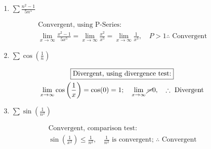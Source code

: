     \begin{itemize}
        \item [1.]
        $\sum\frac{n^{2}-1}{5n^{5}}$
        \\
        \begin{mdframed}
            \begin{equation*}
                \begin{gathered}
                    \boxed{\text{Convergent, using P-Series:}}                      \\
                      \lim_{x \to \infty}\frac{x^{2}-1}{5x^{5}}
                    = \lim_{x \to \infty}\frac{x^{2}}{x^{5}} 
                    = \lim_{x \to \infty}\frac{1}{x^{3}}, \quad 
                    P > 1 \therefore \text{ Convergent}
                \end{gathered}
            \end{equation*}
        \end{mdframed}
    
        \item [2.]
        $\sum\cos\left(\frac{1}{n}\right)$
        \\
        \begin{mdframed}
            \begin{equation*}
                \begin{gathered}
                    \boxed{\text{Divergent, using divergence test:}}                \\
                    \lim_{x \to \infty} \cos\left(\frac{1}{x}\right) = \cos(0) = 1;
                    \quad \lim_{x \to \infty} \cancel{=} 0, \quad \therefore 
                    \text{ Divergent}
                \end{gathered}
            \end{equation*}
        \end{mdframed}

        \item [3.]
        $\sum\sin\left(\frac{1}{n^{2}}\right)$
        \\
        \begin{mdframed}
            \begin{equation*}
                \begin{gathered}
                    \boxed{\text{Convergent, comparison test:}}                       \\
                    \sin\left(\frac{1}{x^{2}}\right) \leq \frac{1}{n^{2}},
                    \quad \frac{1}{n^{2}} \text{ is convergent; } \therefore
                    \text{ Convergent}
                \end{gathered}
            \end{equation*}
        \end{mdframed}


\end{itemize}
